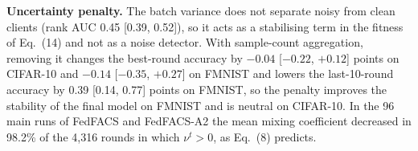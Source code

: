 \textbf{Uncertainty penalty.} The batch variance does not separate noisy from clean clients (rank AUC 0.45 [0.39, 0.52]), so it acts as a stabilising term in the fitness of Eq.~(14) and not as a noise detector. With sample-count aggregation, removing it changes the best-round accuracy by $-0.04$ [$-0.22$, $+0.12$] points on CIFAR-10 and $-0.14$ [$-0.35$, $+0.27$] on FMNIST and lowers the last-10-round accuracy by 0.39 [0.14, 0.77] points on FMNIST, so the penalty improves the stability of the final model on FMNIST and is neutral on CIFAR-10. In the 96 main runs of FedFACS and FedFACS-A2 the mean mixing coefficient decreased in 98.2\% of the 4,316 rounds in which $\nu^t>0$, as Eq.~(8) predicts.
